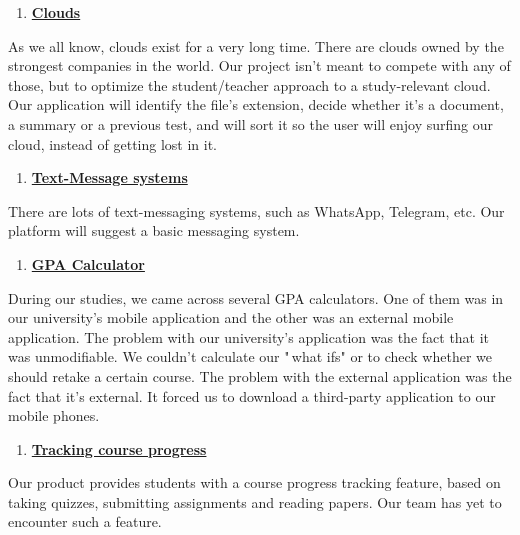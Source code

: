 \documentclass[12pt,a4paper]{article}
\begin{document}
    \begin{enumerate}
        \item \textbf{\underline{Clouds}}
        \setcounter{numberedCntBD}{\theenumi}
    \end{enumerate}
    As we all know, clouds exist for a very long time. There are clouds
    owned by the strongest companies in the world. Our project isn't meant
    to compete with any of those, but to optimize the student/teacher
    approach to a study-relevant cloud. Our application will identify the
    file's extension, decide whether it's a document, a summary or a
    previous test, and will sort it so the user will enjoy surfing our
    cloud, instead of getting lost in it.



    \begin{enumerate}
        \setcounter{enumi}{\thenumberedCntBD}
        \item \textbf{\underline{Text-Message systems}}
        \setcounter{numberedCntBD}{\theenumi}
    \end{enumerate}
    There are lots of text-messaging systems, such as WhatsApp, Telegram,
    etc. Our platform will suggest a basic messaging system.





    \begin{enumerate}
        \setcounter{enumi}{\thenumberedCntBD}
        \item \textbf{\underline{GPA Calculator}}
        \setcounter{numberedCntBD}{\theenumi}
    \end{enumerate}
    During our studies, we came across several GPA calculators. One of them
    was in our university's mobile application and the other was an external
    mobile application. The problem with our university's application was
    the fact that it was unmodifiable. We couldn't calculate our "\,what
    ifs" or to check whether we should retake a certain course. The problem
    with the external application was the fact that it's external. It forced
    us to download a third-party application to our mobile phones.



    \begin{enumerate}
        \setcounter{enumi}{\thenumberedCntBD}
        \item \textbf{\underline{Tracking course progress}}
        \setcounter{numberedCntBD}{\theenumi}
    \end{enumerate}
    Our product provides students with a course progress tracking feature,
    based on taking quizzes, submitting assignments and reading papers. Our
    team has yet to encounter such a feature.
\end{document}
